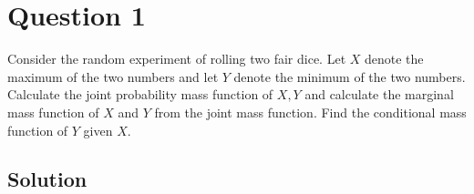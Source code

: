 \section*{Question 1}

Consider the random experiment of rolling two fair dice.
Let \( X \) denote the maximum of the two numbers and let \( Y \) denote the minimum of the two numbers.
Calculate the joint probability mass function of \( X, Y \) and calculate the marginal mass function of \( X \) and \( Y \) from the joint mass function.
Find the conditional mass function of \( Y \) given \( X \).

\subsection*{Solution}
